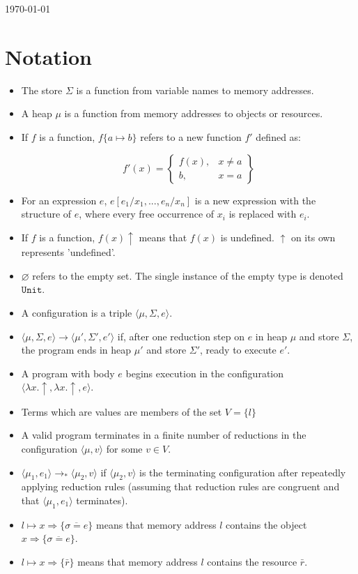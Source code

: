 \documentclass{llncs}
\newcommand{\keywadj}[1]{\mathtt{#1}}
\newcommand{\config}[1] { \langle #1 \rangle }
\begin{document}
\today

\section{Notation}

\begin{itemize}
	\item The store $\Sigma$ is a function from variable names to memory addresses.
	\item A heap $\mu$ is a function from memory addresses to objects or resources.
	\item If $f$ is a function, $f\{ a \mapsto b\}$ refers to a new function $f'$ defined as:
	
\[
f'(x) = 
\left\{\begin{array}{lr}
	f(x), & x \neq a \\
	b, & x = a
\end{array}\right\}
\]

	\item For an expression $e$, $e[e_1/x_1, ..., e_n/x_n]$ is a new expression with the structure of $e$, where every free occurrence of $x_i$ is replaced with $e_i$.
	\item If $f$ is a function, $f(x) \uparrow$ means that $f(x)$ is undefined. $\uparrow$ on its own represents 'undefined'.
	\item $\varnothing$ refers to the empty set. The single instance of the empty type is denoted $\keywadj{Unit}$.
	\item A configuration is a triple $\config{\mu, \Sigma, e}$.
	\item $\config{\mu, \Sigma, e} \longrightarrow \config{\mu', \Sigma', e'}$ if, after one reduction step on $e$ in heap $\mu$ and store $\Sigma$, the program ends in heap $\mu'$ and store $\Sigma'$, ready to execute $e'$.
	\item A program with body $e$ begins execution in the configuration $\config{\lambda x . \uparrow, \lambda x . \uparrow, e}$.
	\item Terms which are values are members of the set $V = \{ l \}$
	\item A valid program terminates in a finite number of reductions in the configuration $\config{\mu, v}$ for some $v \in V$.
	\item $\config{\mu_1, e_1} \longrightarrow_* \config{\mu_2, v}$ if $\config{\mu_2, v}$ is the terminating configuration after repeatedly applying reduction rules (assuming that reduction rules are congruent and that $\config{\mu_1, e_1}$ terminates).
	\item $l \mapsto x \Rightarrow \{ \overline{\sigma = e} \}$ means that memory address $l$ contains the object $x \Rightarrow \{ \overline{\sigma = e} \}$.
	\item $l \mapsto x \Rightarrow \{ \bar r \}$ means that memory address $l$ contains the resource $\bar r$.
\end{itemize}
\end{document}
